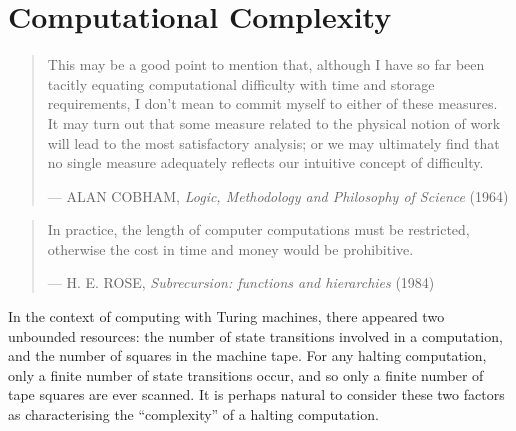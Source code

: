 \chapter{Computational Complexity}

\begin{quotation}

\footnotesize\sffamily\itshape

\begin{flushright}

This may be a good point to mention that, although I have so far been tacitly
equating computational difficulty with time and storage requirements, I don't
mean to commit myself to either of these measures. It may turn out that some
measure related to the physical notion of work will lead to the most
satisfactory analysis; or we may ultimately find that no single measure
adequately reflects our intuitive concept of difficulty.

\smallbreak

\upshape

--- ALAN COBHAM, {\itshape Logic, Methodology and Philosophy of Science} (1964)

\end{flushright}

\end{quotation}

\begin{quotation}

\footnotesize\sffamily\itshape

\begin{flushright}

In practice, the length of computer computations must be restricted, otherwise
the cost in time and money would be prohibitive.

\smallbreak

\upshape

--- H. E. ROSE, {\itshape Subrecursion: functions and hierarchies} (1984)

\end{flushright}

\end{quotation}


In the context of computing with Turing machines, there appeared two unbounded
resources: the number of state transitions involved in a computation, and the
number of squares in the machine tape. For any halting computation, only a
finite number of state transitions occur, and so only a finite number of tape
squares are ever scanned. It is perhaps natural to consider these two factors
as characterising the ``complexity'' of a halting computation.

